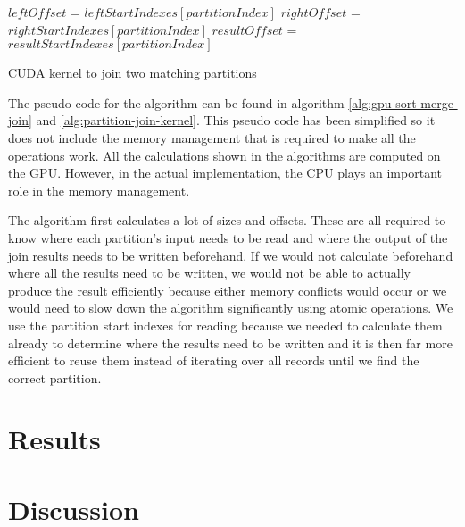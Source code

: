 \documentclass[a4paper,titlepage]{article}
\begin{document}
\begin{algorithm}[ht]
 \label{alg:partition-join-kernel}
 $leftOffset$ = $leftStartIndexes[partitionIndex]$ \;
 $rightOffset$ = $rightStartIndexes[partitionIndex]$ \;
 $resultOffset$ = $resultStartIndexes[partitionIndex]$ \;
 \;
 \caption{CUDA kernel to join two matching partitions}
\end{algorithm}

The pseudo code for the algorithm can be found in algorithm \ref{alg:gpu-sort-merge-join} and \ref{alg:partition-join-kernel}. This pseudo code has been simplified so it does not include the memory management that is required to make all the operations work. All the calculations shown in the algorithms are computed on the GPU. However, in the actual implementation, the CPU plays an important role in the memory management. 

The algorithm first calculates a lot of sizes and offsets. These are all required to know where each partition's input needs to be read and where the output of the join results needs to be written beforehand. If we would not calculate beforehand where all the results need to be written, we would not be able to actually produce the result efficiently because either memory conflicts would occur or we would need to slow down the algorithm significantly using atomic operations. We use the partition start indexes for reading because we needed to calculate them already to determine where the results need to be written and it is then far more efficient to reuse them instead of iterating over all records until we find the correct partition.

\section{Results}
\label{sec:results}

\section{Discussion}
\label{sec:discussion}
\end{document}
